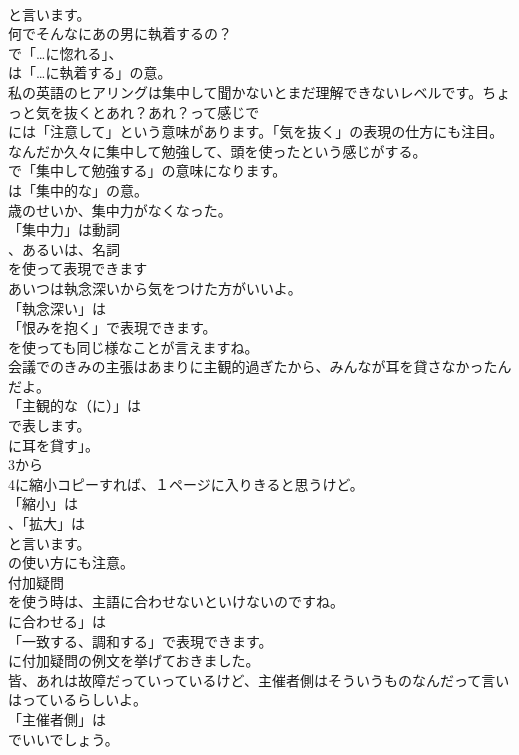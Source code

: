 \documentclass[8pt]{extreport}
\begin{document}
\begin{CJK}{UTF8}{min}
\\	と言います。	
\\	何でそんなにあの男に執着するの？ 
\\	で「…に惚れる」、
\\	は「…に執着する」の意。	
\\	私の英語のヒアリングは集中して聞かないとまだ理解できないレベルです。ちょっと気を抜くとあれ？あれ？って感じで 
\\	には「注意して」という意味があります。「気を抜く」の表現の仕方にも注目。	
\\	なんだか久々に集中して勉強して、頭を使ったという感じがする。 
\\	で「集中して勉強する」の意味になります。
\\	は「集中的な」の意。	
\\	歳のせいか、集中力がなくなった。 
\\	「集中力」は動詞
\\	、あるいは、名詞
\\	を使って表現できます	
\\	あいつは執念深いから気をつけた方がいいよ。 
\\	「執念深い」は
\\	「恨みを抱く」で表現できます。
\\	を使っても同じ様なことが言えますね。	
\\	会議でのきみの主張はあまりに主観的過ぎたから、みんなが耳を貸さなかったんだよ。 
\\	「主観的な（に）」は
\\	で表します。
\\	に耳を貸す」。	
\\	3から
\\	4に縮小コピーすれば、１ページに入りきると思うけど。 
\\	「縮小」は
\\	、「拡大」は
\\	と言います。
\\	の使い方にも注意。	
\\	付加疑問
\\	を使う時は、主語に合わせないといけないのですね。 
\\	に合わせる」は
\\	「一致する、調和する」で表現できます。
\\	に付加疑問の例文を挙げておきました。	
\\	皆、あれは故障だっていっているけど、主催者側はそういうものなんだって言いはっているらしいよ。 
\\	「主催者側」は
\\	でいいでしょう。

\end{CJK}
\end{document}
